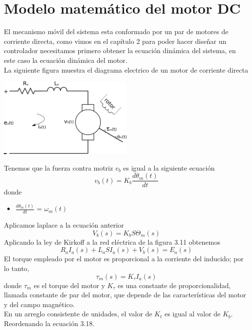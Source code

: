 \section{Modelo matemático del motor DC}
El mecanismo móvil del sistema esta conformado por un par de motores de corriente directa, como vimos
en el capítulo 2 para poder hacer diseñar un controlador necesitamos primero obtener la ecuación dinámica
del sistema, en este caso la ecuación dinámica del motor.\\
La siguiente figura muestra el diagrama electrico de un motor de corriente directa
\begin{center}
	\includegraphics[width=0.5\textwidth]{Contenido/Cuerpo/Capitulo3/Fig16.eps}
	\label{fig:ModeloMat:Fig1}
\end{center}
Tenemos que la fuerza contra motriz $v_b$ es igual a la siguiente ecuación
\begin{equation}
	v_b(t) =K_b \frac{d\theta_m(t)}{dt}
\end{equation}
donde
\begin{itemize}
	\item $ \frac{d\theta_m(t)}{dt} $ = $ \omega_m(t) $
\end{itemize}
Aplicamos laplace a la ecuación anterior
\begin{equation}
	V_b(s) = K_bS\Theta_m(s)
\end{equation}
Aplicando la ley de Kirkoff a la red eléctrica de la figura 3.11 obtenemos
\begin{equation}
	R_aI_a(s) + L_aSI_a(s) + V_b(s) = E_a(s)
\end{equation}
El torque empleado por el motor es proporcional a la corriente del inducido; por lo tanto,
\begin{equation}
	\tau_m(s) = K_\tau I_a(s)
\end{equation}
donde $\tau_m$ es el torque del motor y $K_\tau$ es una constante de proporcionalidad, llamada constante de par del motor, que depende de las características del motor y del
campo magnético.\\
En un arreglo consistente de unidades, el valor de $K_t$ es igual al valor de $K_b$. Reordenando la ecuación 3.18.
